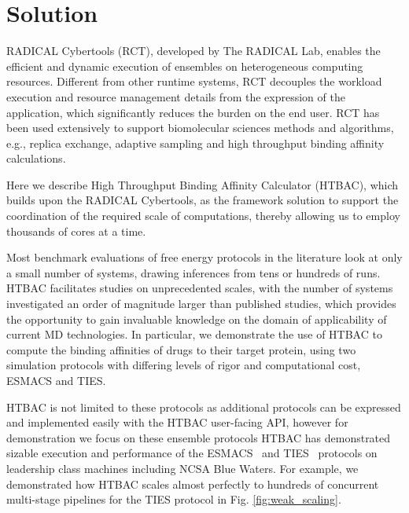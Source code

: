 \documentclass[conference]{IEEEtran}
\begin{document}
\section{Solution}\label{sec:solution}


RADICAL Cybertools (RCT), developed by The RADICAL Lab, enables the
efficient and dynamic execution of ensembles on heterogeneous computing
resources. Different from other runtime systems, RCT decouples the workload
execution and resource management details from the expression of the
application, which significantly reduces the burden on the end user.
RCT has been used extensively to support
biomolecular sciences methods and algorithms, e.g., replica exchange, adaptive
sampling and high throughput binding affinity calculations.

Here we describe High Throughput Binding Affinity Calculator (HTBAC),
which builds upon the RADICAL Cybertools, as the framework solution to support
the coordination of the required scale of computations, thereby
allowing us to employ thousands of cores at a time.

Most benchmark evaluations of free energy protocols in the literature look
at only a small number of systems, drawing inferences from tens or hundreds
of runs. HTBAC facilitates studies on unprecedented scales, with the number
of systems investigated an order of magnitude larger than published studies,
which provides the opportunity to gain invaluable knowledge on the domain of
applicability of current MD technologies. In particular, we demonstrate the
use of HTBAC to compute the binding affinities of drugs to their
target protein, using two simulation protocols with differing
levels of rigor and computational cost, ESMACS and TIES.

HTBAC is not limited to these protocols as additional protocols can be
expressed and implemented easily with the HTBAC user-facing API, however for
demonstration we focus on these ensemble protocols HTBAC has demonstrated
sizable execution and performance of the ESMACS~\cite{dakka2017} and TIES~\cite{dakka_farkaspall} protocols on leadership
class machines including NCSA Blue Waters. For example, we demonstrated how HTBAC
scales almost perfectly to hundreds of concurrent multi-stage pipelines for the TIES 
protocol in Fig. \ref{fig:weak_scaling}.
\end{document}
